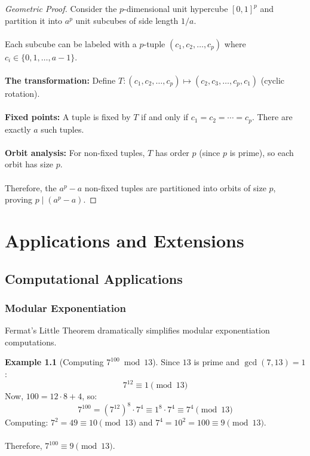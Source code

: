 \documentclass[12pt,openany]{book}
\theoremstyle{definition}
\newtheorem{example}{Example}[chapter]
\theoremstyle{plain}
\theoremstyle{remark}
\begin{document}
\begin{proof}[Geometric Proof]
Consider the $p$-dimensional unit hypercube $[0,1]^p$ and partition it into $a^p$ unit subcubes of side length $1/a$.
\noindent
\\
\\
Each subcube can be labeled with a $p$-tuple $(c_1, c_2, \ldots, c_p)$ where $c_i \in \{0, 1, \ldots, a-1\}$.
\noindent
\\
\\
\textbf{The transformation:} Define $T: (c_1, c_2, \ldots, c_p) \mapsto (c_2, c_3, \ldots, c_p, c_1)$ (cyclic rotation).
\noindent
\\
\\
\textbf{Fixed points:} A tuple is fixed by $T$ if and only if $c_1 = c_2 = \cdots = c_p$. There are exactly $a$ such tuples.
\noindent
\\
\\
\textbf{Orbit analysis:} For non-fixed tuples, $T$ has order $p$ (since $p$ is prime), so each orbit has size $p$.
\noindent
\\
\\
Therefore, the $a^p - a$ non-fixed tuples are partitioned into orbits of size $p$, proving $p \mid (a^p - a)$.
\end{proof}

\chapter{Applications and Extensions}

\section{Computational Applications}

\subsection{Modular Exponentiation}

Fermat's Little Theorem dramatically simplifies modular exponentiation computations.

\begin{example}[Computing $7^{100} \bmod 13$]
Since $13$ is prime and $\gcd(7,13) = 1$:
\[
7^{12} \equiv 1 \pmod{13}
\]
\noindent
Now, $100 = 12 \cdot 8 + 4$, so:
\[
7^{100} = (7^{12})^8 \cdot 7^4 \equiv 1^8 \cdot 7^4 \equiv 7^4 \pmod{13}
\]
\noindent
Computing: $7^2 = 49 \equiv 10 \pmod{13}$ and $7^4 = 10^2 = 100 \equiv 9 \pmod{13}$.
\noindent
\\
\\
Therefore, $7^{100} \equiv 9 \pmod{13}$.
\end{example}
\end{document}
